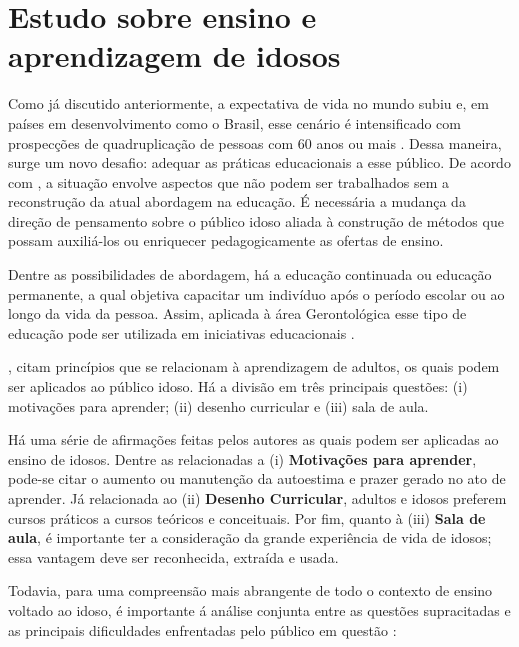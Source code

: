 \section{Estudo sobre ensino e aprendizagem de idosos}

Como já discutido anteriormente, a expectativa de vida no mundo subiu e, em países em desenvolvimento como o Brasil, esse cenário é intensificado com prospecções de quadruplicação de pessoas com 60 anos ou mais \citep{demografico2010disponivel}. Dessa maneira, surge um novo desafio: adequar as práticas educacionais a esse público. De acordo com \cite{rethinkingTeacherEducation}, a situação envolve aspectos que não podem ser trabalhados sem a reconstrução da atual abordagem na educação. É necessária a mudança da direção de pensamento sobre o público idoso aliada à construção de métodos que possam auxiliá-los ou enriquecer pedagogicamente as ofertas de ensino.

Dentre as possibilidades de abordagem, há a educação continuada ou educação permanente, a qual objetiva capacitar um indivíduo após o período escolar ou ao longo da vida da pessoa. Assim, aplicada à área Gerontológica esse tipo de educação pode ser utilizada em iniciativas educacionais \citep{neri2001palavras}. 

\cite{zemke198430}, citam princípios que se relacionam à aprendizagem de adultos, os quais podem ser aplicados ao público idoso. Há a divisão em três principais questões: (i) motivações para aprender; (ii) desenho curricular e (iii) sala de aula. 

Há uma série de afirmações feitas pelos autores as quais podem ser aplicadas ao ensino de idosos. Dentre as relacionadas a (i) \textbf{Motivações para aprender}, pode-se citar o aumento ou manutenção da autoestima e prazer gerado no ato de aprender. Já relacionada ao (ii) \textbf{Desenho Curricular}, adultos e idosos preferem cursos práticos a cursos teóricos e conceituais. Por fim, quanto à (iii) \textbf{Sala de aula}, é importante ter a consideração da grande experiência de vida de idosos; essa vantagem deve ser reconhecida, extraída e usada.


Todavia, para uma compreensão mais abrangente de todo o contexto de ensino voltado ao idoso, é importante á análise conjunta entre as questões supracitadas e as principais dificuldades enfrentadas pelo público em questão \citep{euromed}:

